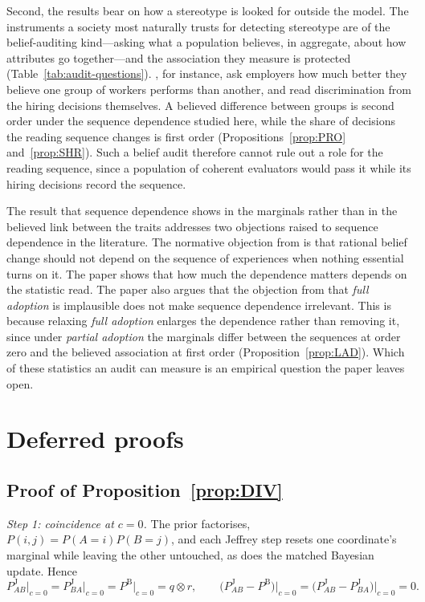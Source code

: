 \documentclass[a4paper,fleqn]{cas-sc}
\theoremstyle{remark}
\theoremstyle{definition}
\newcommand{\PB}{P^{\mathrm{B}}}
\newcommand{\PJ}{P^{\mathrm{J}}}
\begin{document}
Second, the results bear on how a stereotype is looked for outside the model. The instruments a society most naturally trusts for detecting stereotype are
of the belief-auditing kind---asking what a population believes, in aggregate, about how attributes go together---and the association they measure is protected
(Table~\ref{tab:audit-questions}). \citet{CoffmanExleyNiederle2021}, for instance, ask employers how much better
they believe one group of workers performs than another, and read discrimination from the hiring decisions themselves. A believed difference between groups is second
order under the sequence dependence studied here, while the share of decisions the reading sequence changes is first order (Propositions~\ref{prop:PRO}
and~\ref{prop:SHR}). Such a belief audit therefore cannot rule out a role for the reading sequence, since a population of coherent evaluators would pass it while its
hiring decisions record the sequence.

The result that sequence dependence shows in the marginals rather than in the believed link between the traits addresses two objections raised to sequence dependence in the literature. The normative objection from \citet{Doring1999} is that rational belief change should not depend on the sequence of experiences when nothing essential turns on it. The
paper shows that how much the dependence matters depends on the statistic read. The paper also argues that the objection
from \citet{Hawthorne2004} that \emph{full adoption} is implausible does not make sequence dependence irrelevant. This is because relaxing \emph{full adoption} enlarges the dependence
rather than removing it, since under \emph{partial adoption} the marginals differ between the sequences at order zero and the believed association at first order
(Proposition~\ref{prop:LAD}). Which of these statistics an audit can measure is an empirical question the paper leaves open.


\appendix

\section{Deferred proofs}
\label{app:proofs}

\subsection{Proof of Proposition~\ref{prop:DIV}}

\emph{Step 1: coincidence at $c=0$.} The prior factorises, $P(i,j)=P(A{=}i)P(B{=}j)$, and each
Jeffrey step resets one coordinate's marginal while leaving the other untouched, as does the
matched Bayesian update. Hence
\[
  \PJ_{AB}\big|_{c=0}=\PJ_{BA}\big|_{c=0}=\PB\big|_{c=0}=q\otimes r,
  \qquad
  \bigl(\PJ_{AB}-\PB\bigr)\big|_{c=0}
   =\bigl(\PJ_{AB}-\PJ_{BA}\bigr)\big|_{c=0}=0 .
\]
\end{document}
